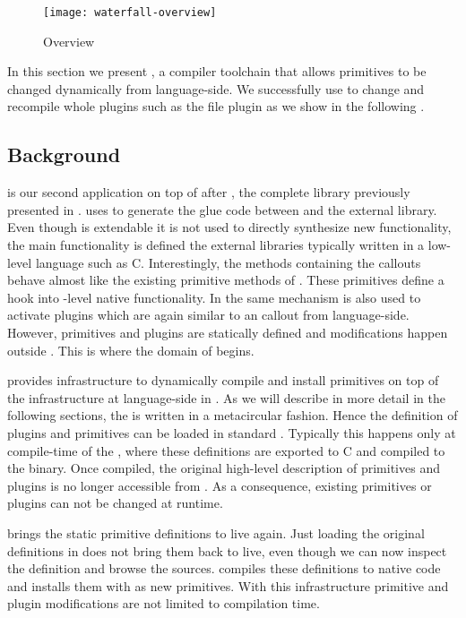 \begin{figure}[h]
	\centering
	\texttt{[image: waterfall-overview]}
	\caption{\WF Overview}
\end{figure}

\noindent In this section we present \WF, a compiler toolchain that allows primitives to be changed dynamically from language-side.
We successfully use \WF to change and recompile whole \VM plugins such as the file plugin as we show in the following .

\subsection{Background}

\WF is our second application on top of \B after \NB, the complete \FFI library previously presented in .
\NB uses \B to generate the glue code between \PH and the external library.
Even though \NB is extendable it is not used to directly synthesize new functionality, the main functionality is defined the external libraries typically written in a low-level language such as C.
Interestingly, the \NB methods containing the callouts behave almost like the existing primitive methods of \PH.
These primitives define a hook into \VM-level native functionality.
In \PH the same mechanism is also used to activate plugins which are again similar to an \FFI callout from language-side.
However, primitives and plugins are statically defined and modifications happen outside \PH.
This is where the domain of \WF begins.

\WF provides infrastructure to dynamically compile and install primitives on top of the \B infrastructure at language-side in \PH.
As we will describe in more detail in the following sections, the \PH \VM is written in a metacircular fashion.
Hence the definition of plugins and primitives can be loaded in standard \PH.
Typically this happens only at compile-time of the \VM, where these definitions are exported to C and compiled to the \VM binary.
Once compiled, the original high-level description of primitives and plugins is no longer accessible from \PH.
As a consequence, existing primitives or plugins can not be changed at runtime.

\WF brings the static primitive definitions to live again.
Just loading the original definitions in \PH does not bring them back to live, even though we can now inspect the definition and browse the sources.
\WF compiles these definitions to native code and installs them with \B as new primitives.
With this infrastructure primitive and plugin modifications are not limited to \VM compilation time.


